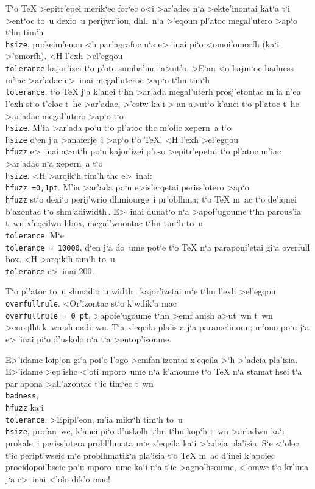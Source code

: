 T`o {\rm \TeX} >epitr'epei merik`ec for`ec o<i >ar'adec n`a
>ekte'inontai kat`a t`i >ent`oc to~u dexio~u perijwr'iou, dhl.\ n`a     
>'eqoun pl'atoc megal'utero >ap`o t`hn tim`h {\tt \\hsize}, prokeim'enou
<h par'agrafoc n`a e>~inai pi`o <omoi'omorfh (ka`i >'omorfh).  <H l'exh
>el'egqou {\tt \\tolerance} kajor'izei t`o p'ote sumba'inei a>ut'o.     
>E`an <o bajm`oc {\rm badness} m'iac >ar'adac e>~inai megal'uteroc >ap`o
t`hn tim`h {\tt \\tolerance}, t`o {\rm \TeX} j`a k'anei t`hn >ar'ada
megal'uterh prosj'etontac m'ia n'ea l'exh st`o t'eloc t~hc >ar'adac,
>'estw ka`i >`an a>ut`o k'anei t`o pl'atoc t~hc >ar'adac megal'utero
>ap`o t`o {\tt \\hsize}.  M'ia >ar'ada po`u t`o pl'atoc thc m'olic
xepern~a t`o {\tt \\hsize} d`en j`a >anaferje~i >ap`o t`o {\rm
\TeX}\null. <H l'exh >el'egqou {\tt\\hfuzz} e>~inai a>ut`h po`u
kajor'izei p'oso >epitr'epetai t`o pl'atoc m'iac >ar'adac n`a xepern~a
t`o {\tt\\hsize}.  <H >arqik`h tim'h thc e>~inai: {\tt \\hfuzz         
=\NB{}0,1\NB{}pt}.  M'ia >ar'ada po`u e>is'erqetai periss'otero >ap`o
{\tt \\hfuzz} st`o dexi`o perij'wrio dhmiourge~i pr'oblhma; t`o
{\rm\TeX} m~ac t`o de'iqnei b'azontac t`o 
shm'adi\NB{}\vrule width\overfullrule$\,$.  E>~inai dunat`o n`a
>apof'ugoume t`hn parous'ia t~wn x'eqeilwn {\rm hbox}, megal'wnontac
t`hn tim`h to~u {\tt \\tolerance}.  M`e {\tt \\tolerance = 10000}, d`en
j`a do~ume pot`e t`o {\rm \TeX} n`a  paraponi'etai gi`a {\rm overfull
box}.  <H >arqik`h tim`h to~u {\tt \\tolerance} e>~inai 200.%

T`o pl'atoc to~u shmadio~u \vrule width \overfullrule\ kajor'izetai m`e
t`hn l'exh >el'egqou {\tt \\overfullrule}.  <Or'i\-zon\-tac st`o
k'wdik'a mac {\tt \\overfullrule = 0 pt}, >apofe'ugoume t`hn >emf'anish
a>ut~wn t~wn >enoqlhtik~wn shmadi~wn.  T`a x'eqeila pla'isia j`a
parame'inoun; m'ono po`u j`a e>~inai pi`o d'uskolo n`a t`a
>ento\-p'i\-soume.

E>'idame loip`on gi`a poi'o l'ogo >emfan'izontai x'eqeila >`h >'adeia
pla'isia.  E>'idame >ep'ishc <'oti mporo~ume n`a k'anoume t`o {\rm \TeX}
n`a stamat'hsei t`a par'apona >all'azontac t`ic tim`ec t~wn {\tt
\\badness}, {\tt \\hfuzz} ka`i {\tt \\tolerance}. >Epipl'eon, m'ia
mikr`h tim`h to~u {\tt \\hsize}, profan~wc, k'anei pi`o d'uskolh t`hn
t`hn kop`h t~wn >ar'adwn ka`i prokale~i periss'otera probl'hmata m`e
x'eqeila ka`i >'adeia pla'isia.  S`e <'olec t`ic peript'wseic m`e
problhmatik`a pla'isia t`o {\rm \TeX} m~ac d'inei k'apoiec
proeidopoi'hseic po`u mporo~ume ka`i n`a t`ic >agno'hsoume, <'omwc  t`o
kr'ima j`a e>~inai <'olo dik'o mac!

